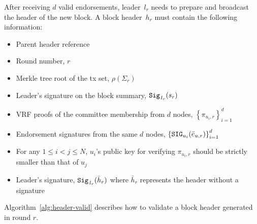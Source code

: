 \documentclass{article}
\begin{document}
After receiving $d$ valid endorsements, leader~$l_r$ needs to prepare and broadcast the header of the new block. A block header~$h_r$ must contain the following information:
\begin{itemize}
    \item Parent header reference 
    \item Round number, $r$
    \item Merkle tree root of the tx set, $\rho\left(\Sigma_r\right)$
    \item Leader's signature on the block summary, ${\tt Sig}_{\,l_r}(s_r)$
    \item VRF proofs of the committee membership from $d$ nodes, $\left\{\pi_{u_i,r}\right\}_{i=1}^d$
    \item Endorsement signatures from the same $d$ nodes, $\left\{{\tt SIG}_{u_i}(\bar{e}_{u,r})\right\}_{i=1}^d$
    \item For any $1\leq i<j\leq N$, $u_i$'s public key for verifying $\pi_{u_i,r}$ should be strictly smaller than that of $u_j$
    \item Leader's signature, ${\tt Sig}_{\,l_r}(\bar{h}_r)$ where $\bar{h}_r$ represents the header without a signature
\end{itemize}

Algorithm~\ref{alg:header-valid} describes how to validate a block header generated in round $r$. 

\end{document}
